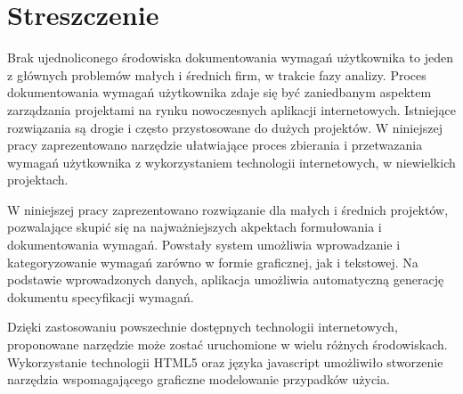 \section{Streszczenie}

  Brak ujednoliconego środowiska dokumentowania wymagań użytkownika to jeden z głównych problemów małych i średnich firm, w trakcie fazy analizy. Proces dokumentowania wymagań użytkownika zdaje się być zaniedbanym aspektem zarządzania projektami na rynku nowoczesnych aplikacji internetowych. Istniejące rozwiązania są drogie i często przystosowane do dużych projektów. W niniejszej pracy zaprezentowano narzędzie ułatwiające proces zbierania i przetwazania wymagań użytkownika z wykorzystaniem technologii internetowych, w niewielkich projektach. 

  W niniejszej pracy zaprezentowano rozwiązanie dla małych i średnich projektów, pozwalające skupić się na najważniejszych akpektach formułowania i dokumentowania wymagań. Powstały system umożliwia wprowadzanie i kategoryzowanie wymagań zarówno w formie graficznej, jak i tekstowej. Na podstawie wprowadzonych danych, aplikacja umożliwia automatyczną generację dokumentu specyfikacji wymagań. 

  Dzięki zastosowaniu powszechnie dostępnych technologii internetowych, proponowane narzędzie może zostać uruchomione w wielu różnych środowiskach. Wykorzystanie technologii HTML5 oraz języka javascript umożliwiło stworzenie narzędzia wspomagającego graficzne modelowanie przypadków użycia.
